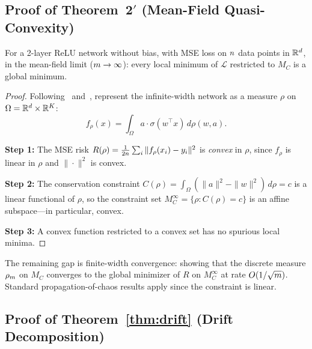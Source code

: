 \subsection{Proof of Theorem~2$'$ (Mean-Field Quasi-Convexity)}
\label{app:proof:meanfield}

\begin{theorem*}
For a 2-layer ReLU network without bias, with MSE loss on $n$ data points in $\mathbb{R}^d$, in the mean-field limit ($m \to \infty$): every local minimum of $\mathcal{L}$ restricted to $M_C$ is a global minimum.
\end{theorem*}

\begin{proof}
Following~\citet{chizat2018global} and~\citet{mei2018mean}, represent the infinite-width network as a measure $\rho$ on $\Omega = \mathbb{R}^d \times \mathbb{R}^K$:
\begin{equation}
    f_\rho(x) = \int_\Omega a \cdot \sigma(w^\top x)\,d\rho(w,a).
\end{equation}

\textbf{Step 1:} The MSE risk $R(\rho) = \frac{1}{2n}\sum_i \|f_\rho(x_i) - y_i\|^2$ is \emph{convex} in $\rho$, since $f_\rho$ is linear in $\rho$ and $\|\cdot\|^2$ is convex.

\textbf{Step 2:} The conservation constraint $C(\rho) = \int_\Omega (\|a\|^2 - \|w\|^2)\,d\rho = c$ is a linear functional of $\rho$, so the constraint set $M_C^\infty = \{\rho : C(\rho) = c\}$ is an affine subspace---in particular, convex.

\textbf{Step 3:} A convex function restricted to a convex set has no spurious local minima.
\end{proof}

\begin{remark}
The remaining gap is finite-width convergence: showing that the discrete measure $\rho_m$ on $M_C$ converges to the global minimizer of $R$ on $M_C^\infty$ at rate $O(1/\sqrt{m})$. Standard propagation-of-chaos results apply since the constraint is linear.
\end{remark}

\subsection{Proof of Theorem~\ref{thm:drift} (Drift Decomposition)}
\label{app:proof:drift}

